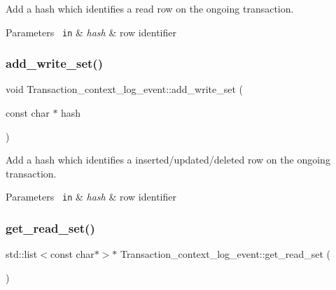 Add a hash which identifies a read row on the ongoing transaction.


\begin{DoxyParams}[1]{Parameters}
\mbox{\texttt{ in}}  & {\em hash} & row identifier \\
\hline
\end{DoxyParams}
\mbox{\label{classTransaction__context__log__event_a2f9e55762a33d63feb95604054c7d774}} 
\subsubsection{\texorpdfstring{add\+\_\+write\+\_\+set()}{add\_write\_set()}}
{\footnotesize\ttfamily void Transaction\+\_\+context\+\_\+log\+\_\+event\+::add\+\_\+write\+\_\+set (\begin{DoxyParamCaption}\item[{const char $\ast$}]{hash }\end{DoxyParamCaption})}

Add a hash which identifies a inserted/updated/deleted row on the ongoing transaction.


\begin{DoxyParams}[1]{Parameters}
\mbox{\texttt{ in}}  & {\em hash} & row identifier \\
\hline
\end{DoxyParams}
\mbox{\label{classTransaction__context__log__event_a50e7d23deff3a573ac9816d4e450b8a5}} 
\subsubsection{\texorpdfstring{get\+\_\+read\+\_\+set()}{get\_read\_set()}}
{\footnotesize\ttfamily std\+::list$<$const char$\ast$$>$$\ast$ Transaction\+\_\+context\+\_\+log\+\_\+event\+::get\+\_\+read\+\_\+set (\begin{DoxyParamCaption}{ }\end{DoxyParamCaption})\hspace{0.3cm}{\ttfamily [inline]}}

